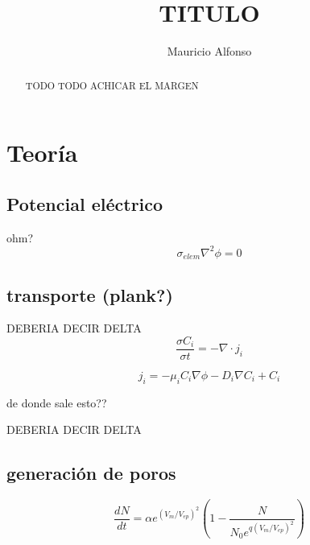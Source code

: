 \documentclass[a4paper,10pt]{article}
\title{TITULO}
\author{Mauricio Alfonso}
\begin{document}
\maketitle

\begin{abstract}
TODO
TODO ACHICAR EL MARGEN

\end{abstract}


\section{Teoría}

\subsection{Potencial eléctrico}

ohm?\\

\begin{equation} \label{eq:poisson}
	\sigma_{elem} \nabla^{2} \phi = 0 
\end{equation}

\subsection{transporte (plank?)}

DEBERIA DECIR DELTA
\begin{equation} \label{eq:trans1}
	\frac{\sigma C_i}{\sigma t} = -\nabla \cdot j_i
\end{equation}

\begin{equation} \label{eq:trans2}
	j_i = -\mu_i C_i \nabla \phi - D_i \nabla C_i + C_i
\end{equation}

de donde sale esto??

DEBERIA DECIR DELTA
\subsection{generación de poros}
\begin{equation}
	\frac{dN}{dt} = \alpha e^{(V_m/V_{ep})^2} \left( 1 - \frac{N}{N_0 e^{q \left(V_m/V_{ep} \right) ^2}} \right)
\end{equation}

\end{document}
